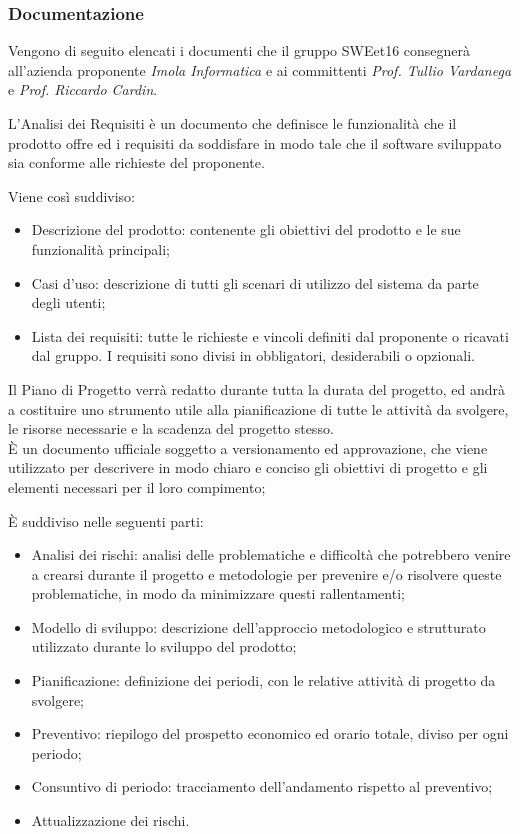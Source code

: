 \subsubsection{Documentazione}

Vengono di seguito elencati i documenti che il gruppo SWEet16 consegnerà all'azienda proponente \textit{Imola Informatica} e ai committenti \textit{Prof. Tullio Vardanega} e \textit{Prof. Riccardo Cardin}.



    L'Analisi dei Requisiti è un documento che definisce le funzionalità che il prodotto offre ed i requisiti da soddisfare in modo tale che il software sviluppato sia conforme alle richieste del proponente. 

    Viene così suddiviso:
    \begin{itemize}
        \item Descrizione del prodotto: contenente gli obiettivi del prodotto e le sue funzionalità principali;
        \item Casi d'uso: descrizione di tutti gli scenari di utilizzo del sistema da parte degli utenti;
        \item Lista dei requisiti: tutte le richieste e vincoli definiti dal proponente o ricavati dal gruppo.
              I requisiti sono divisi in obbligatori, desiderabili o opzionali.
    \end{itemize}




    Il Piano di Progetto verrà redatto durante tutta la durata del progetto, ed andrà a costituire uno strumento utile alla pianificazione di tutte le attività da svolgere, le risorse necessarie e la scadenza del progetto stesso. \\
    È un documento ufficiale soggetto a versionamento ed approvazione, che viene utilizzato per descrivere in modo chiaro e conciso gli obiettivi di progetto e gli elementi necessari per il loro compimento; 
    
    È suddiviso nelle seguenti parti: 
    \begin{itemize}
        \item Analisi dei rischi: analisi delle problematiche e difficoltà che potrebbero venire a crearsi durante il progetto e metodologie per prevenire e/o risolvere queste problematiche, in modo da minimizzare questi rallentamenti;
        \item Modello di sviluppo: descrizione dell'approccio metodologico e strutturato utilizzato durante lo sviluppo del prodotto; 
        \item Pianificazione: definizione dei periodi, con le relative attività di progetto da svolgere;
        \item Preventivo: riepilogo del prospetto economico ed orario totale, diviso per ogni periodo;
        \item Consuntivo di periodo: tracciamento dell’andamento rispetto al preventivo;
        \item Attualizzazione dei rischi.
    \end{itemize}

